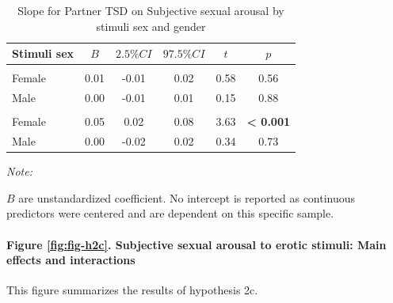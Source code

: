 \documentclass[
  bookmarksnumbered]{article}
\begin{document}
\begin{table}[H]
\centering
\caption{\label{tab:unnamed-chunk-26}Slope for Partner TSD on 
        Subjective sexual arousal by stimuli sex and gender}
\centering
\begin{threeparttable}
\begin{tabular}[t]{lccccc}
\toprule
Stimuli sex & $B$ & $2.5\% CI$ & $97.5\% CI$ & $t$ & $p$\\
\midrule
\addlinespace[0.3em]
\multicolumn{6}{l}{\cellcolor{lightgray}{Gender: Women}}\\
\hspace{1em}Female & 0.01 & -0.01 & 0.02 & 0.58 & 0.56\\
\hspace{1em}Male & 0.00 & -0.01 & 0.01 & 0.15 & 0.88\\
\addlinespace[0.3em]
\multicolumn{6}{l}{\cellcolor{lightgray}{Gender: Men}}\\
\hspace{1em}Female & 0.05 & 0.02 & 0.08 & 3.63 & \textbf{< 0.001}\\
\hspace{1em}Male & 0.00 & -0.02 & 0.02 & 0.34 & 0.73\\
\bottomrule
\end{tabular}
\begin{tablenotes}[para]
\item \textit{Note: } 
\item $B$ are unstandardized coefficient.
           No intercept is reported as continuous predictors were centered
           and are dependent on this specific sample.
\end{tablenotes}
\end{threeparttable}
\end{table}

\paragraph{Figure \ref{fig:fig-h2c}. Subjective sexual arousal to erotic stimuli: Main effects and interactions}\label{figure-reffigfig-h2c.-subjective-sexual-arousal-to-erotic-stimuli-main-effects-and-interactions}

This figure summarizes the results of hypothesis 2c.
\end{document}
